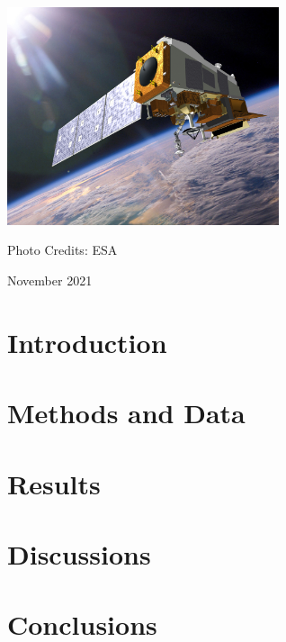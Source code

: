 \documentclass{physics_article_B}
\begin{document}
\begin{titlepage}
	\vspace{0.5\baselineskip} %
	
	
	\vspace{2.0cm}
	\includegraphics[width = 80mm]{img_press_140106_suomi-npp.jpg}
	
	{Photo Credits: ESA}
	
	
	
	
	\vspace{1.8cm} %
	
	
	
	\vspace{1cm}
	
	November 2021

\end{titlepage}


\tableofcontents


\newpage

\begin{abstract}

\end{abstract}



\section{Introduction}


\newpage
\section{Methods and Data}

 

\section{Results}



\section{Discussions}



\section{Conclusions}



\newpage


\end{document}
